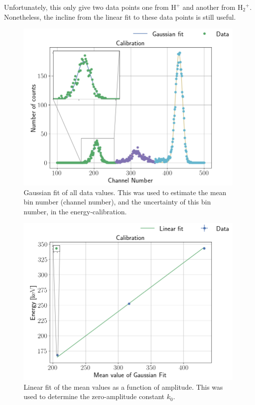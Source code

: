 Unfortunately, this only give two data points one from $\mathrm{H^+}$ and
another from $\mathrm{{H_2}^+}$. Nonetheless, the incline from the linear fit
to these data points is still useful.

\begin{figure}[t]
\centering
\includegraphics[width=0.99\columnwidth]{gaussian_fit2}
\caption{Gaussian fit of all data values. This was used to estimate the mean
bin number (channel number), and the uncertainty of this bin number, in the
energy-calibration.}
\label{fig_gaussian_fit2}
\end{figure}

\begin{figure}[t]
\centering
\includegraphics[width=0.99\columnwidth]{alpha_plotting}
\caption{Linear fit of the mean values as a function of amplitude. This was
used to determine the zero-amplitude constant $k_0$.}
\label{fig_linear_fit2}
\end{figure}





